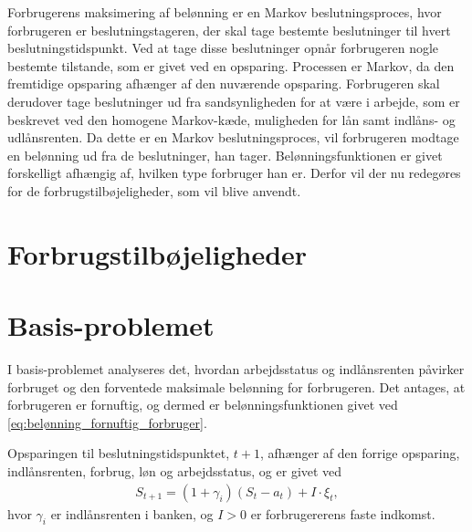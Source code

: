 Forbrugerens maksimering af belønning er en Markov beslutningsproces, hvor forbrugeren er beslutningstageren, der skal tage bestemte beslutninger til hvert beslutningstidspunkt. Ved at tage disse beslutninger opnår forbrugeren nogle bestemte tilstande, som er givet ved en opsparing. Processen er Markov, da den fremtidige opsparing afhænger af den nuværende opsparing. Forbrugeren skal derudover tage beslutninger ud fra sandsynligheden for at være i arbejde, som er beskrevet ved den homogene Markov-kæde, muligheden for lån samt indlåns- og udlånsrenten. %
Da dette er en Markov beslutningsproces, vil forbrugeren modtage en belønning ud fra de beslutninger, han tager. Belønningsfunktionen er givet forskelligt afhængig af, hvilken type forbruger han er. Derfor vil der nu redegøres for de forbrugstilbøjeligheder, som vil blive anvendt. 


\section{Forbrugstilbøjeligheder}


\section{Basis-problemet}
I basis-problemet analyseres det, hvordan arbejdsstatus og indlånsrenten påvirker forbruget og den forventede maksimale belønning for forbrugeren. Det antages, at forbrugeren er fornuftig, og dermed er belønningsfunktionen givet ved \eqref{eq:belønning_fornuftig_forbruger}. 

Opsparingen til beslutningstidspunktet, $t+1$, afhænger af den forrige opsparing, indlånsrenten, forbrug, løn og arbejdsstatus, og er givet ved
\begin{align}\label{st+1}
    S_{t+1}=(1+\gamma_i)(S_t-a_t)+I \cdot \xi_t,
\end{align}
hvor $\gamma_i$ er indlånsrenten i banken, og $I>0$ er forbrugererens faste indkomst.

